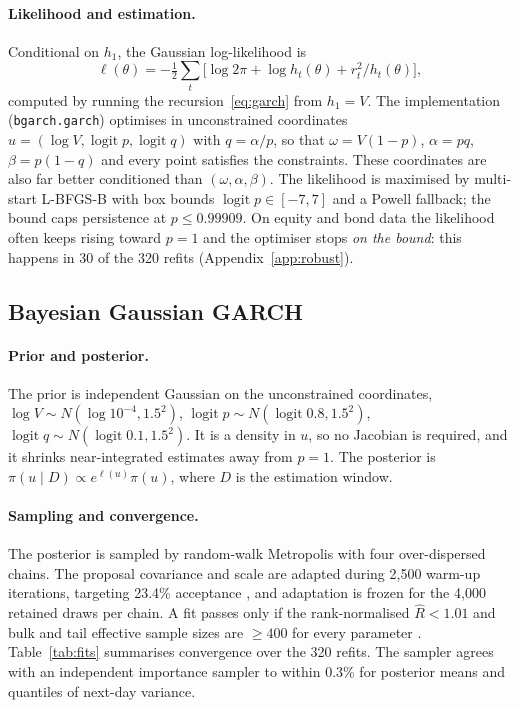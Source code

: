 \documentclass[11pt]{article}
\newcommand{\logit}{\operatorname{logit}}
\begin{document}
\paragraph{Likelihood and estimation.} Conditional on $h_1$, the Gaussian log-likelihood is
\begin{equation}\label{eq:loglik}
\ell(\theta)=-\tfrac12\sum_t\bigl[\log 2\pi+\log h_t(\theta)+r_t^2/h_t(\theta)\bigr],
\end{equation}
computed by running the recursion~\eqref{eq:garch} from $h_1=V$. The implementation (\texttt{bgarch.garch}) optimises
in unconstrained coordinates $u=(\log V,\logit p,\logit q)$ with $q=\alpha/p$, so that $\omega=V(1-p)$, $\alpha=pq$,
$\beta=p(1-q)$ and every point satisfies the constraints. These coordinates are also far better conditioned than
$(\omega,\alpha,\beta)$. The likelihood is maximised by multi-start L-BFGS-B with box bounds $\logit p\in[-7,7]$ and a
Powell fallback; the bound caps persistence at $p\le0.99909$. On equity and bond data the likelihood often keeps
rising toward $p=1$ and the optimiser stops \emph{on the bound}: this happens in 30 of the 320 refits
(Appendix~\ref{app:robust}).

\subsection{Bayesian Gaussian GARCH}
\paragraph{Prior and posterior.} The prior is independent Gaussian on the unconstrained coordinates,
$\log V\sim N(\log10^{-4},1.5^2)$, $\logit p\sim N(\logit0.8,1.5^2)$, $\logit q\sim N(\logit0.1,1.5^2)$. It is a
density in $u$, so no Jacobian is required, and it shrinks near-integrated estimates away from $p=1$. The posterior
is $\pi(u\mid D)\propto e^{\ell(u)}\pi(u)$, where $D$ is the estimation window.

\paragraph{Sampling and convergence.} The posterior is sampled by random-walk Metropolis with four over-dispersed
chains. The proposal covariance and scale are adapted during 2{,}500 warm-up iterations, targeting 23.4\% acceptance
\cite{roberts1997,haario2001}, and adaptation is frozen for the 4{,}000 retained draws per chain. A fit passes only if
the rank-normalised $\hat R<1.01$ and bulk and tail effective sample sizes are $\ge400$ for every parameter
\cite{vehtari2021}. Table~\ref{tab:fits} summarises convergence over the 320 refits. The sampler agrees with an
independent importance sampler to within 0.3\% for posterior means and quantiles of next-day variance.
\end{document}
